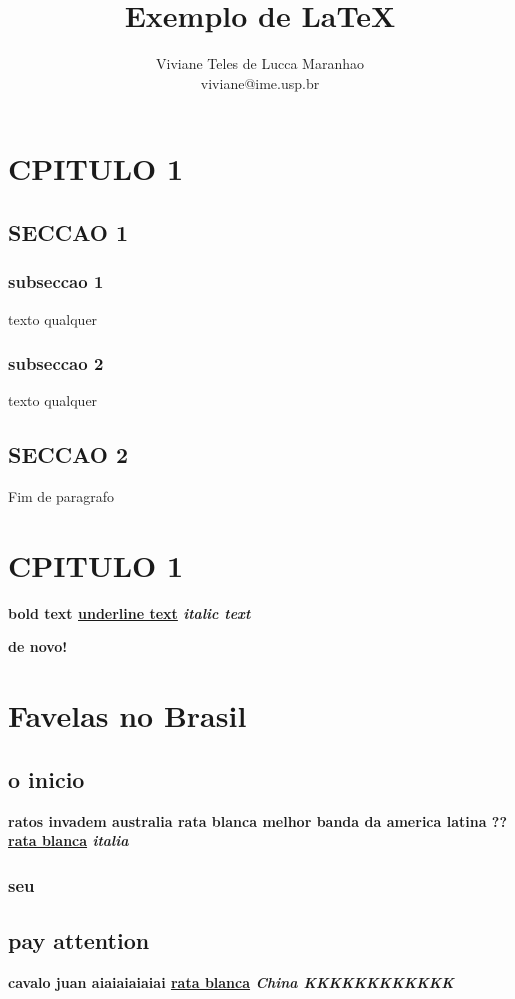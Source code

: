 \documentclass[12pt]{article}
\title{Exemplo de \LaTeX} %
\author{Viviane Teles de Lucca Maranhao \\ viviane@ime.usp.br} %
\begin{document}
	\chapter{CPITULO 1}

	\section{SECCAO 1}

	\subsection{subseccao 1}
		texto qualquer

	\subsection{subseccao 2}
		texto qualquer

	\section{SECCAO 2}
	Fim de paragrafo \par
	
	\chapter{CPITULO 1}


	\bf{bold text} 
	\underline{underline text}
	\it{italic text}
	\par
	
	\bf{de novo!}\par
	\chapter{Favelas no Brasil}
	\section{o inicio}
	\bf{ratos invadem australia} rata blanca melhor banda da america latina ?? 
	\underline{rata blanca} \it{italia}\par
	\subsection{seu}
	\section{pay attention}
	\bf{cavalo juan}  aiaiaiaiaiai 
	\underline{rata blanca} \it{China KKKKKKKKKKKK}\par
\end{document}
